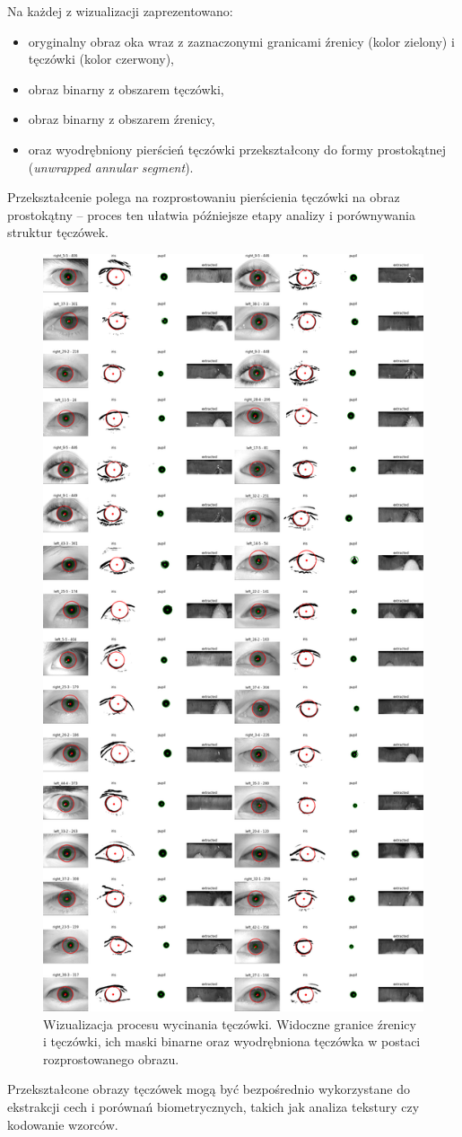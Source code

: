 \documentclass[a4paper]{article}
\begin{document}
Na każdej z wizualizacji zaprezentowano:
\begin{itemize}
    \item oryginalny obraz oka wraz z zaznaczonymi granicami źrenicy (kolor zielony) i tęczówki (kolor czerwony),
    \item obraz binarny z obszarem tęczówki,
    \item obraz binarny z obszarem źrenicy,
    \item oraz wyodrębniony pierścień tęczówki przekształcony do formy prostokątnej (\textit{unwrapped annular segment}).
\end{itemize}

Przekształcenie polega na rozprostowaniu pierścienia tęczówki na obraz prostokątny – proces ten ułatwia późniejsze etapy analizy i porównywania struktur tęczówek.

\begin{figure}[H]
    \centering
    \includegraphics[width=0.5\linewidth]{figures/final_comphrasion.png}
    \caption{Wizualizacja procesu wycinania tęczówki. Widoczne granice źrenicy i tęczówki, ich maski binarne oraz wyodrębniona tęczówka w postaci rozprostowanego obrazu.}
    \label{fig:final_comparison}
\end{figure}

Przekształcone obrazy tęczówek mogą być bezpośrednio wykorzystane do ekstrakcji cech i porównań biometrycznych, takich jak analiza tekstury czy kodowanie wzorców.
\end{document}
